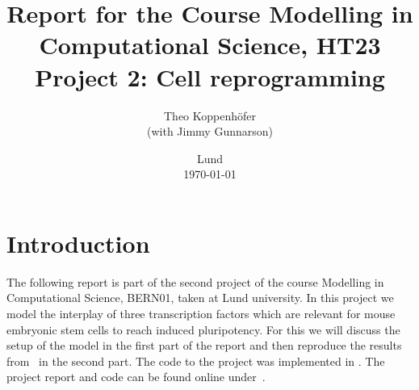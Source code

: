 





\title{ Report for the Course Modelling in Computational Science, HT23 \\[1ex]
	  \large Project 2: Cell reprogramming}
\author{Theo Koppenhöfer \\[1ex] (with Jimmy Gunnarson)}
\date{Lund \\[1ex] \today}



\usepackage{pythonhighlight}
\usepackage{pgfplots}
\graphicspath{{../Plots/}}


\newcommand{\Nover}{N_\text{over}}
\newcommand{\Oover}{O_\text{over}}
\newcommand{\Tover}{T_\text{over}}
\newcommand{\Ntotal}{\text{N}}
\newcommand{\Ototal}{\text{O}}
\newcommand{\Ttotal}{\text{T}}
\newcommand{\NT}{\text{N-T}}
\newcommand{\LIF}{\text{LIF}}






\maketitle

\section{Introduction}
The following report is part of the second project of the course Modelling in Computational Science, BERN01, taken at Lund university.
In this project we model the interplay of three transcription factors which are relevant for mouse embryonic stem cells to reach induced
pluripotency.
For this we will discuss the setup of the model in the first part of the report and then reproduce the results from~\cite{Olariu2016} in the second part.
The code to the project was implemented in .
The project report and code can be found online under~\cite{Repository}.

